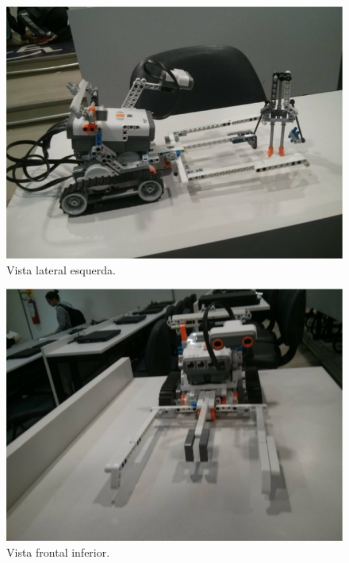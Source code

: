 \begin{apendicesenv}
\begin{figure}[h]
    \centering
    \includegraphics[keepaspectratio=true,scale=0.55]
      {figuras/robo_003.eps}
    \caption{Vista lateral esquerda.}
\end{figure}

\begin{figure}[h]
    \centering
    \includegraphics[keepaspectratio=true,scale=0.55]
      {figuras/robo_005.eps}
    \caption{Vista frontal inferior.}
\end{figure}


\end{apendicesenv}
